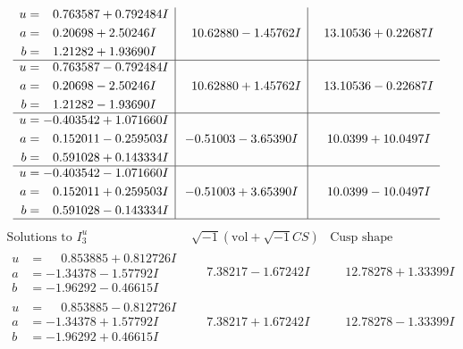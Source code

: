 \documentclass[1p]{elsarticle_modified}
\theoremstyle{definition}
\newcommand{\I}{\sqrt{-1}}
\begin{document}
$$\begin{array}{c|c|c}
\begin{aligned}
u &= \phantom{-}0.763587 + 0.792484 I \\
a &= \phantom{-}0.20698 + 2.50246 I \\
b &= \phantom{-}1.21282 + 1.93690 I\end{aligned}
 & \phantom{-}10.62880 - 1.45762 I & \phantom{-}13.10536 + 0.22687 I \\ \hline\begin{aligned}
u &= \phantom{-}0.763587 - 0.792484 I \\
a &= \phantom{-}0.20698 - 2.50246 I \\
b &= \phantom{-}1.21282 - 1.93690 I\end{aligned}
 & \phantom{-}10.62880 + 1.45762 I & \phantom{-}13.10536 - 0.22687 I \\ \hline\begin{aligned}
u &= -0.403542 + 1.071660 I \\
a &= \phantom{-}0.152011 - 0.259503 I \\
b &= \phantom{-}0.591028 + 0.143334 I\end{aligned}
 & -0.51003 - 3.65390 I & \phantom{-}10.0399 + 10.0497 I \\ \hline\begin{aligned}
u &= -0.403542 - 1.071660 I \\
a &= \phantom{-}0.152011 + 0.259503 I \\
b &= \phantom{-}0.591028 - 0.143334 I\end{aligned}
 & -0.51003 + 3.65390 I & \phantom{-}10.0399 - 10.0497 I\\
 \hline 
 \end{array}$$\newpage$$\begin{array}{c|c|c}  
\text{Solutions to }I^u_{3}& \I (\text{vol} + \sqrt{-1}CS) & \text{Cusp shape}\\
 \hline 
\begin{aligned}
u &= \phantom{-}0.853885 + 0.812726 I \\
a &= -1.34378 - 1.57792 I \\
b &= -1.96292 - 0.46615 I\end{aligned}
 & \phantom{-}7.38217 - 1.67242 I & \phantom{-}12.78278 + 1.33399 I \\ \hline\begin{aligned}
u &= \phantom{-}0.853885 - 0.812726 I \\
a &= -1.34378 + 1.57792 I \\
b &= -1.96292 + 0.46615 I\end{aligned}
 & \phantom{-}7.38217 + 1.67242 I & \phantom{-}12.78278 - 1.33399 I \\ \hline\begin{aligned}

\end{aligned}
\end{array}$$
\end{document}

